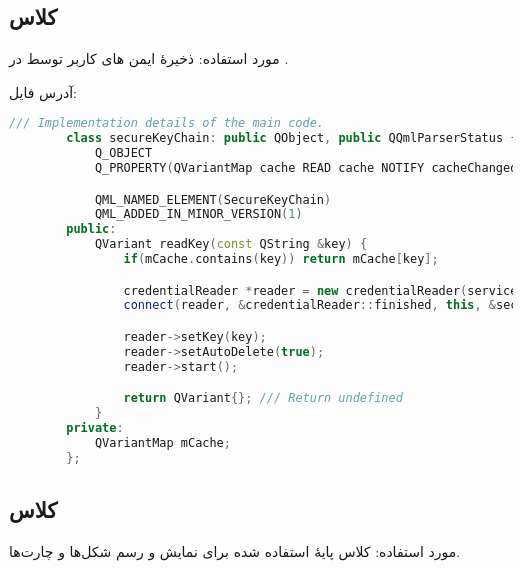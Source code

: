\subsection{کلاس }
مورد استفاده: ذخیرهٔ ایمن های کاربر توسط در .

آدرس فایل:
\hyperref{https://github.com/cardianco/cardian/blob/master/cardian/securekeychain.h}{}{}{}
\begin{latin}
	\small
	\begin{lstlisting}[language=C++, caption={C++ KeyChain Component}]
		/// Implementation details of the main code.
		class secureKeyChain: public QObject, public QQmlParserStatus {
			Q_OBJECT
			Q_PROPERTY(QVariantMap cache READ cache NOTIFY cacheChanged FINAL)

			QML_NAMED_ELEMENT(SecureKeyChain)
			QML_ADDED_IN_MINOR_VERSION(1)
		public:
   			QVariant readKey(const QString &key) {
				if(mCache.contains(key)) return mCache[key];

				credentialReader *reader = new credentialReader(service, this);
				connect(reader, &credentialReader::finished, this, &secureKeyChain::readerFinished);

				reader->setKey(key);
				reader->setAutoDelete(true);
				reader->start();

				return QVariant{}; /// Return undefined
			}
		private:
			QVariantMap mCache;
		};
	\end{lstlisting}
\end{latin}

\subsection{کلاس }
مورد استفاده: کلاس پایهٔ استفاده شده برای نمایش و رسم شکل‌ها و چارت‌ها.

